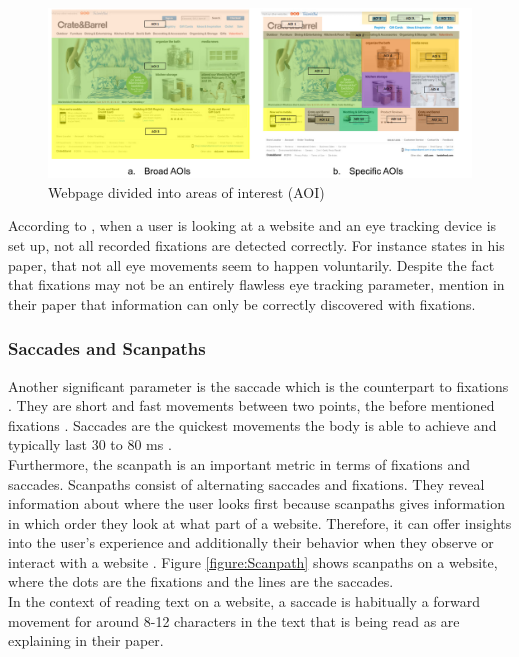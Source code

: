 \begin{figure}[t]
    \centering
    \includegraphics[width=0.75\linewidth]{images/AOI_djamasbi2014eye.png}
    \caption{
        Webpage divided into areas of interest (AOI) \autocite[48]{djamasbi2014eye}
    }
    \label{figure:AOI}
\end{figure}

According to \textcite[]{grzyb2016eye}, when a user is looking at a website and an eye tracking device is set up, not all recorded fixations are detected correctly.
For instance \textcite[]{bruneau2002eyes} states in his paper, that not all eye movements seem to happen voluntarily. 
Despite the fact that fixations may not be an entirely flawless eye tracking parameter, \textcite[]{biedert2010eyebook} mention in their paper that information can only be correctly discovered with fixations.

\subsubsection{Saccades and Scanpaths}
Another significant parameter is the saccade which is the counterpart to fixations \autocite{goldberg2002eye}. They are short and fast movements between two points, the before mentioned fixations \autocite{goldberg2002eye, beymer2007eye}. Saccades are the quickest movements the body is able to achieve and typically last 30 to 80 ms \autocite[]{blascheck2014state}. \\
Furthermore, the scanpath is an important metric in terms of fixations and saccades. Scanpaths consist of alternating saccades and fixations. They reveal information about where the user looks first because scanpaths gives information in which order they look at what part of a website. Therefore, it can offer insights into the user's experience and additionally their behavior when they observe or interact with a website \autocite[]{lorigo2008eye, blascheck2014state}. Figure \ref{figure:Scanpath} shows scanpaths on a website, where the dots are the fixations and the lines are the saccades. \\
In the context of reading text on a website, a saccade is habitually a forward movement for around 8-12 characters in the text that is being read as \textcite[]{beymer2007eye} are explaining in their paper.

